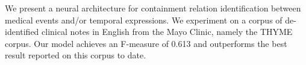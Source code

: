 We present a neural architecture for containment relation identification between medical events and/or temporal expressions. We experiment on a corpus of de-identified clinical notes in English from the Mayo Clinic, namely the THYME corpus. Our model achieves an F-measure of 0.613 and outperforms the best result reported on this corpus to date.
